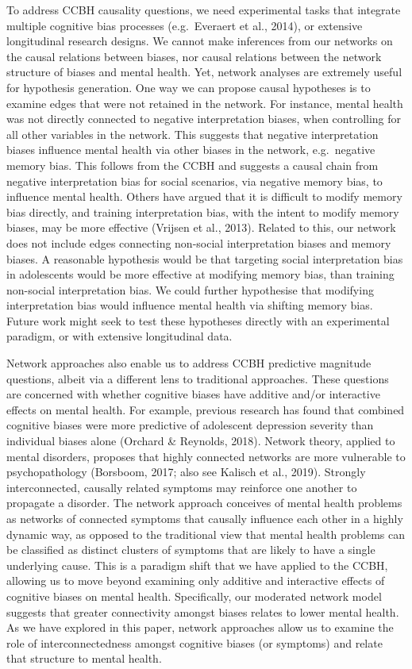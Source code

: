 \documentclass[man,floatsintext]{apa6}
\begin{document}
To address CCBH causality questions, we need experimental tasks that integrate multiple cognitive bias processes (e.g.~Everaert et al., 2014), or extensive longitudinal research designs. We cannot make inferences from our networks on the causal relations between biases, nor causal relations between the network structure of biases and mental health. Yet, network analyses are extremely useful for hypothesis generation. One way we can propose causal hypotheses is to examine edges that were not retained in the network. For instance, mental health was not directly connected to negative interpretation biases, when controlling for all other variables in the network. This suggests that negative interpretation biases influence mental health via other biases in the network, e.g.~negative memory bias. This follows from the CCBH and suggests a causal chain from negative interpretation bias for social scenarios, via negative memory bias, to influence mental health. Others have argued that it is difficult to modify memory bias directly, and training interpretation bias, with the intent to modify memory biases, may be more effective (Vrijsen et al., 2013). Related to this, our network does not include edges connecting non-social interpretation biases and memory biases. A reasonable hypothesis would be that targeting social interpretation bias in adolescents would be more effective at modifying memory bias, than training non-social interpretation bias. We could further hypothesise that modifying interpretation bias would influence mental health via shifting memory bias. Future work might seek to test these hypotheses directly with an experimental paradigm, or with extensive longitudinal data.

Network approaches also enable us to address CCBH predictive magnitude questions, albeit via a different lens to traditional approaches. These questions are concerned with whether cognitive biases have additive and/or interactive effects on mental health. For example, previous research has found that combined cognitive biases were more predictive of adolescent depression severity than individual biases alone (Orchard \& Reynolds, 2018). Network theory, applied to mental disorders, proposes that highly connected networks are more vulnerable to psychopathology (Borsboom, 2017; also see Kalisch et al., 2019). Strongly interconnected, causally related symptoms may reinforce one another to propagate a disorder. The network approach conceives of mental health problems as networks of connected symptoms that causally influence each other in a highly dynamic way, as opposed to the traditional view that mental health problems can be classified as distinct clusters of symptoms that are likely to have a single underlying cause. This is a paradigm shift that we have applied to the CCBH, allowing us to move beyond examining only additive and interactive effects of cognitive biases on mental health. Specifically, our moderated network model suggests that greater connectivity amongst biases relates to lower mental health. As we have explored in this paper, network approaches allow us to examine the role of interconnectedness amongst cognitive biases (or symptoms) and relate that structure to mental health.
\end{document}
